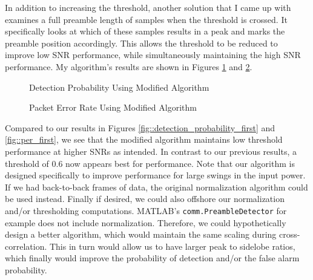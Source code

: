 \documentclass{article}
\begin{document}
	In addition to increasing the threshold, another solution that I came up with examines a full preamble length of samples when the threshold is crossed. It specifically looks at which of these samples results in a peak and marks the preamble position accordingly. This allows the threshold to be reduced to improve low SNR performance, while simultaneously maintaining the high SNR performance. My algorithm's results are shown in Figures \ref{fig::detection_probability_mod} and \ref{fig::per_mod}.
	
\begin{figure}[H]
	\centerline{}
	\caption{Detection Probability Using Modified Algorithm}
	\label{fig::detection_probability_mod}
\end{figure}

\begin{figure}[H]
	\centerline{}
	\caption{Packet Error Rate Using Modified Algorithm}
	\label{fig::per_mod}
\end{figure}

\noindent Compared to our results in Figures \ref{fig::detection_probability_first} and \ref{fig::per_first}, we see that the modified algorithm maintains low threshold performance at higher SNRs as intended. In contrast to our previous results, a threshold of 0.6 now appears best for performance. Note that our algorithm is designed specifically to improve performance for large swings in the input power. If we had back-to-back frames of data, the original normalization algorithm could be used instead. Finally if desired, we could also offshore our normalization and/or thresholding computations. MATLAB's \texttt{comm.PreambleDetector} for example does not include normalization. Therefore, we could hypothetically design a better algorithm, which would maintain the same scaling during cross-correlation. This in turn would allow us to have larger peak to sidelobe ratios, which finally would improve the probability of detection and/or the false alarm probability.
\end{document}
